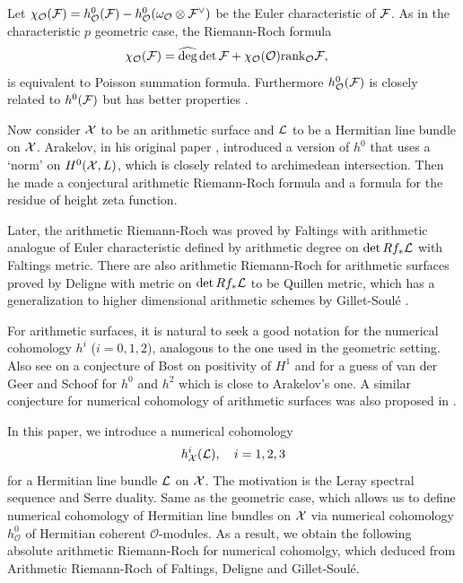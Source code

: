 \documentclass[]{amsart}
\newcommand{\CO}{{\mathcal {O}}} \newcommand{\CP}{{\mathcal {P}}}
\newcommand{\wh}{\widehat}
\theoremstyle{plain}
\theoremstyle{remark} \newtheorem{remark}[thm]{Remark}
\theoremstyle{remark} \newtheorem{exercise}{Exercise}
\theoremstyle{remark} \newtheorem{example}{Example}
\numberwithin{equation}{section}
\begin{document}
Let $\chi_\CO(\CF)=h^0_\CO(\CF)-h^0_\CO(\omega_{\CO}\otimes\CF^\vee)$ be the Euler characteristic of ${\mathcal {F}}$.
As in the characteristic $p$ geometric case, the Riemann-Roch formula 
\[\chi_\CO(\CF)=\wh{\deg}\det\CF+\chi_\CO(\CO)\rank_{\CO}\CF,\quad \] is equivalent to Poisson summation formula. Furthermore $h_{\CO}^0(\CF)$ is closely related to $h^0({\mathcal {F}})$ but has better properties \cite[Preface~\&~Sec.~3.1]{Bost:2020}. 

Now consider ${\mathcal {X}}$ to be an arithmetic surface and ${\mathcal {L}}$ to be a Hermitian line bundle on ${\mathcal {X}}$. Arakelov, in his original paper \cite{Arakelov:1974}, introduced a version of $h^0$ that uses a `norm' on $H^0({\mathcal {X}}, L)$, which is closely related to archimedean intersection. Then he made a conjectural arithmetic Riemann-Roch formula and a formula for the residue of height zeta function. 

Later, the arithmetic Riemann-Roch was proved by Faltings \cite{Faltings} with arithmetic analogue of Euler characteristic defined by arithmetic degree on $\det Rf_*{\mathcal {L}}$ with Faltings metric. There are also arithmetic Riemann-Roch for arithmetic surfaces proved by Deligne \cite{Deligne:85} with metric on $\det Rf_*{\mathcal {L}}$ to be Quillen metric, which has a generalization to higher dimensional arithmetic schemes by Gillet-Soul\'{e} \cite{Gillet-Soule}.


For arithmetic surfaces, it is natural to seek a good notation for the numerical cohomology $h^i$ ($i=0,1,2$), analogous to the one used in the geometric setting. Also see \cite[Conj.~2.1.1]{Zhou2} on a conjecture of Bost on positivity of $H^1$ and \cite[Sec.~9]{Geer-Schoof} for a guess of van der Geer and Schoof for $h^0$ and $h^2$ which is close to Arakelov's one. A similar conjecture for numerical cohomology of arithmetic surfaces was also proposed in \cite{Borisov}.

In this paper, we introduce a numerical cohomology \[h^i_{{\mathcal {X}}}({\mathcal {L}}),\quad  i=1,2,3\] for a Hermitian line bundle ${\mathcal {L}}$ on ${\mathcal {X}}$. The motivation is the Leray spectral sequence and Serre duality. Same as the geometric case, which allows us to define numerical cohomology of Hermitian line bundles on ${\mathcal {X}}$ via numerical cohomology $h_\CO^0$ of Hermitian coherent $\CO$-modules. As a result, we obtain the following absolute arithmetic Riemann-Roch for numerical cohomolgy, which deduced from Arithmetic Riemann-Roch of Faltings, Deligne and Gillet-Soul\'{e}.
\end{document}
